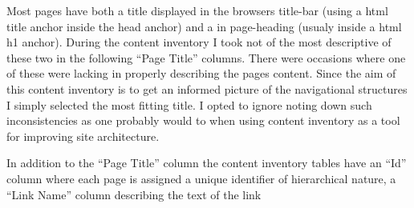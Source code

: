 \documentclass[12pt,a4paper]{article}
\begin{document}
Most pages have both a title displayed in the browsers title-bar (using a
html title anchor inside the head anchor) and a in page-heading (usualy inside
a html h1 anchor). During the content inventory I took not of the most
descriptive of these two in the following ``Page Title'' columns. There were
occasions where one of these were lacking in properly describing the pages
content. Since the aim of this content inventory is to get an informed picture
of the navigational structures I simply selected the most fitting title.
I opted to ignore noting down such inconsistencies as one probably would to
when using content inventory as a tool for improving site architecture.

In addition to the ``Page Title'' column the content inventory tables have an
``Id'' column where each page is assigned a unique identifier of hierarchical
nature, a ``Link Name'' column describing the text of the link 
\end{document}
